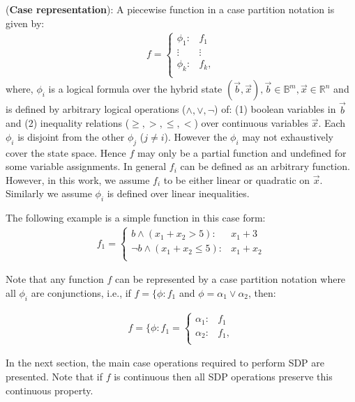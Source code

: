\documentclass[twoside,11pt]{article}
\newenvironment{mydef}[1][Definition]{\begin{trivlist}
\item[\hskip \labelsep {\bfseries #1}]}{\end{trivlist}}
\begin{document}
\begin{mydef}(\textbf{Case representation}): 
\label{defCase}
A piecewise function in a case partition notation is given by:
{%
\begin{align*}
f = 
\begin{cases}
  \phi_1: & f_1 \\ 
 \vdots&\vdots\\ 
  \phi_k: & f_k, \\ 
\end{cases}
\end{align*}
}
where, $\phi_i$ is a logical formula over the hybrid state $(\vec{b},\vec{x}), \vec{b} \in \mathbb{B}^m, \vec{x} \in \mathbb{R}^n$ and is defined by arbitrary logical operations ($\land,\lor,\neg$) of: 
(1) boolean variables in $\vec{b}$ and (2) 
inequality relations ($\geq,>,\leq,<$) over continuous variables $\vec{x}$. 
Each $\phi_i$ is disjoint from the other $\phi_j$ ($j \neq i$). However the $\phi_i$ may not exhaustively cover the state space. Hence $f$ may only be a partial function and undefined for some variable assignments. 
In general $f_i$ can be defined as an arbitrary function. However, in this work, we assume $f_i$ to be either linear or quadratic on $\vec{x}$. Similarly we assume $\phi_i$ is defined over linear inequalities.
\end{mydef}

The following example is a simple function in this case form: 
\begin{align*}
f_1 = 
\begin{cases}
b \wedge (x_1+x_2 >5) : & x_1+3 \\ 
\neg b \wedge (x_1+x_2 \leq 5) : & x_1+x_2 \\ 
\end{cases} 
\end{align*}

Note that any function $f$ can be represented by a case partition notation where all $\phi_i$ are conjunctions, i.e., if $f=\{\phi: f_1$ and $\phi= \alpha_1 \vee \alpha_2$, then:

\begin{align*}
f =\{ \phi:f_1 =
\begin{cases}
  \alpha_1: & f_1 \\ 
  \alpha_2: & f_1, \\ 
\end{cases}
\end{align*}




In the next section, the main case operations required to perform SDP are presented. Note that if $f$ is continuous then all SDP operations preserve this continuous property. 
\end{document}

